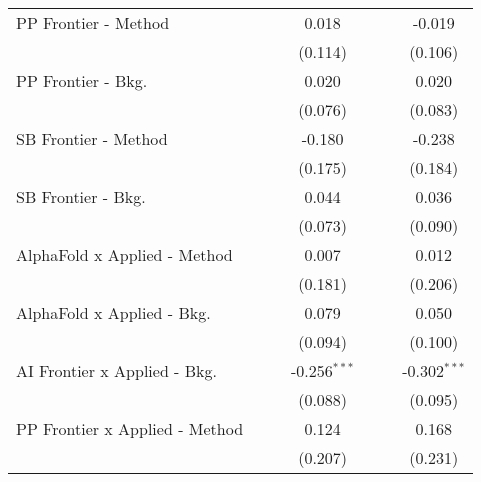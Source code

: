 \begin{tabular}{lcccccc}
   PP Frontier - Method           &               &             & 0.018          &                &             & -0.019\\   
                                  &               &             & (0.114)        &                &             & (0.106)\\   
   PP Frontier - Bkg.             &               &             & 0.020          &                &             & 0.020\\   
                                  &               &             & (0.076)        &                &             & (0.083)\\   
   SB Frontier - Method           &               &             & -0.180         &                &             & -0.238\\   
                                  &               &             & (0.175)        &                &             & (0.184)\\   
   SB Frontier - Bkg.             &               &             & 0.044          &                &             & 0.036\\   
                                  &               &             & (0.073)        &                &             & (0.090)\\   
   AlphaFold x Applied - Method   &               &             & 0.007          &                &             & 0.012\\   
                                  &               &             & (0.181)        &                &             & (0.206)\\   
   AlphaFold x Applied - Bkg.     &               &             & 0.079          &                &             & 0.050\\   
                                  &               &             & (0.094)        &                &             & (0.100)\\   
   AI Frontier x Applied - Bkg.   &               &             & -0.256$^{***}$ &                &             & -0.302$^{***}$\\   
                                  &               &             & (0.088)        &                &             & (0.095)\\   
   PP Frontier x Applied - Method &               &             & 0.124          &                &             & 0.168\\   
                                  &               &             & (0.207)        &                &             & (0.231)\\   

\end{tabular}
